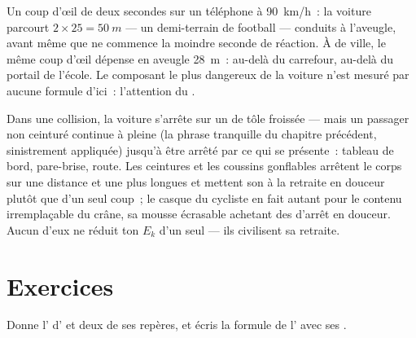 \begin{example}\label{ex:g9:kinetic-energy-safety:glance}
Un coup d'œil de deux secondes sur un téléphone à \qty{90}{km/h}~: la
voiture parcourt $2 \times 25 = \qty{50}{m}$ --- un demi-terrain de
football --- conduits à l'aveugle, avant même que ne commence la
moindre seconde de réaction. À  de ville, le même coup d'œil
dépense en aveugle \qty{28}{m}~: au-delà du carrefour, au-delà du
portail de l'école. Le composant le plus dangereux de la voiture n'est
mesuré par aucune formule d'ici~: l'attention du .
\end{example}

\begin{remark}\label{rem:g9:kinetic-energy-safety:belts}
Dans une collision, la voiture s'arrête sur un  de tôle froissée
--- mais un passager non ceinturé continue à pleine  (la phrase
tranquille du chapitre précédent, sinistrement appliquée) jusqu'à être
arrêté par ce qui se présente~: tableau de bord, pare-brise, route.
Les ceintures et les coussins gonflables arrêtent le corps sur une
distance et une  plus longues et mettent son  à
la retraite en douceur plutôt que d'un seul coup~; le casque du
cycliste en fait autant pour le contenu irremplaçable du crâne, sa
mousse écrasable achetant des  d'arrêt en douceur. Aucun
d'eux ne réduit ton $E_k$ d'un seul  --- ils civilisent sa
retraite.
\end{remark}

\section{Exercices}

\begin{exercise}[$\star$]\label{exo:g9:kinetic-energy-safety:1}
Donne l' d' et deux de ses repères, et écris la formule de
l' avec ses .
\end{exercise}

